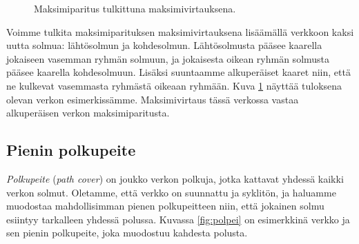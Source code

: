 \begin{figure}
\center
\begin{center}
\end{center}
\caption{Maksimiparitus tulkittuna maksimivirtauksena.}
\label{fig:parver}
\end{figure}

Voimme tulkita maksimiparituksen maksimivirtauksena
lisäämällä verkkoon kaksi uutta solmua: lähtösolmun ja kohdesolmun.
Lähtösolmusta pääsee kaarella jokaiseen vasemman ryhmän solmuun,
ja jokaisesta oikean ryhmän solmusta pääsee kaarella kohdesolmuun.
Lisäksi suuntaamme alkuperäiset kaaret niin,
että ne kulkevat vasemmasta ryhmästä oikeaan ryhmään.
Kuva \ref{fig:parver} näyttää tuloksena olevan verkon
esimerkissämme.
Maksimivirtaus tässä verkossa vastaa alkuperäisen verkon
maksimiparitusta.

\subsection{Pienin polkupeite}


\emph{Polkupeite} (\emph{path cover}) on joukko verkon polkuja,
jotka kattavat yhdessä kaikki verkon solmut.
Oletamme, että verkko on suunnattu ja syklitön,
ja haluamme muodostaa mahdollisimman pienen polkupeitteen
niin, että jokainen solmu esiintyy tarkalleen yhdessä polussa.
Kuvassa \ref{fig:polpei} on esimerkkinä verkko ja sen pienin polkupeite,
joka muodostuu kahdesta polusta.

